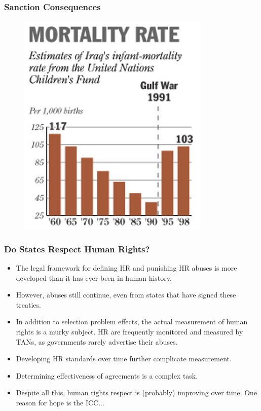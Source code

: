 \documentclass[handout]{beamer}
\begin{document}
\begin{frame} 
	\frametitle{\LARGE{Sanction Consequences}}
	\begin{figure}[ht!]
		\centering
		\includegraphics[width=\textwidth,height=0.8\textheight,keepaspectratio]{Iraqmortality.jpg}
	\end{figure}
\end{frame}

\begin{frame} 
	\frametitle{\LARGE{Do States Respect Human Rights?}}
	\begin{itemize}
		\item The legal framework for defining HR and punishing HR abuses is more developed than it has ever been in human history. \pause
		\item However, abuses still continue, even from states that have signed these treaties. \pause
		\item In addition to selection problem effects, the actual measurement of human rights is a murky subject. HR are frequently monitored and measured by TANs, as governments rarely advertise their abuses. \pause
		\item Developing HR standards over time further complicate measurement. \pause
		\item Determining effectiveness of agreements is a complex task. \pause
		\item Despite all this, human rights respect is (probably) improving over time. One reason for hope is the ICC...
		
		
	\end{itemize}
\end{frame}
\end{document}
